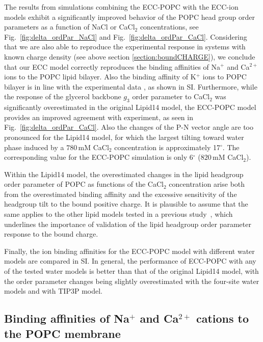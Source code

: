 \documentclass[journal=jpcbfk,manuscript=article]{achemso}
\begin{document}
The results from simulations combining the ECC-POPC with the ECC-ion models \cite{martinek17, kohagen16, Pluharova2014} exhibit a significantly improved behavior of the POPC head group order parameters as a function of NaCl or CaCl$_2$ concentrations, see Fig.~\ref{fig:delta_ordPar_NaCl} and Fig.~\ref{fig:delta_ordPar_CaCl}. Considering that we are also able to reproduce the experimental response in systems with known charge density (see above section \ref{section:boundCHARGE}), we conclude that our ECC model correctly reproduces the binding affinities of Na$^{+}$ and Ca$^{2+}$ ions to the POPC lipid bilayer.
Also the binding affinity of K$^+$ ions to POPC bilayer is in line with the experimental data \cite{eisenberg79,binder02,klasczyk10}, as shown in SI.
Furthermore, while the response of the glycerol backbone $g_3$ order parameter to CaCl$_2$ was significantly overestimated in the original Lipid14 model, the ECC-POPC model provides an improved agreement with experiment, as seen in Fig.~\ref{fig:delta_ordPar_CaCl}.
Also the changes of the P-N vector angle are too pronounced for the Lipid14 model,
for which the largest tilting toward water phase induced by a $780\,\mathrm{mM}$
CaCl$_2$ concentration is approximately 17$^{\circ}$. The corresponding value
for the ECC-POPC simulation is only 6$^{\circ}$ ($820\,\mathrm{mM}$ CaCl$_2$). 

Within the Lipid14 model, the overestimated changes in the lipid headgroup order parameter of POPC  as functions of the CaCl$_2$ concentration arise both from the overestimated binding affinity and the excessive sensitivity of the headgroup tilt to the bound positive charge. It is plausible to assume that the same applies to the other lipid models tested in a previous study~\cite{catte16}, which underlines the importance of validation of the lipid headgroup order parameter response to the bound charge. 

Finally, the ion binding affinities for the ECC-POPC model with different water models are compared in SI. In general, the performance of ECC-POPC with any of the tested water models is better than that of the original Lipid14 model, with the order parameter changes being slightly overestimated with the four-site water models and with TIP3P model.


\subsection{Binding affinities of Na$^+$ and Ca$^{2+}$ cations to the POPC membrane}
\label{sec:affinity}
\end{document}
